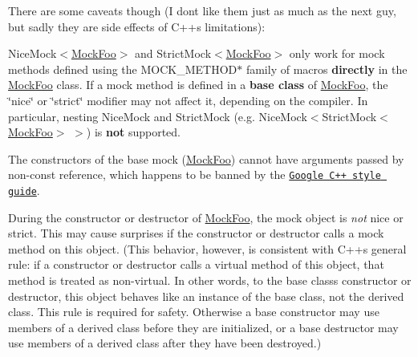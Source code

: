 There are some caveats though (I don\textquotesingle{}t like them just as much as the next guy, but sadly they are side effects of C++\textquotesingle{}s limitations)\+:


\begin{DoxyEnumerate}
\item {\ttfamily Nice\+Mock$<$\hyperlink{classMockFoo}{Mock\+Foo}$>$} and {\ttfamily Strict\+Mock$<$\hyperlink{classMockFoo}{Mock\+Foo}$>$} only work for mock methods defined using the {\ttfamily M\+O\+C\+K\+\_\+\+M\+E\+T\+H\+O\+D$\ast$} family of macros {\bfseries directly} in the {\ttfamily \hyperlink{classMockFoo}{Mock\+Foo}} class. If a mock method is defined in a {\bfseries base class} of {\ttfamily \hyperlink{classMockFoo}{Mock\+Foo}}, the \char`\"{}nice\char`\"{} or \char`\"{}strict\char`\"{} modifier may not affect it, depending on the compiler. In particular, nesting {\ttfamily Nice\+Mock} and {\ttfamily Strict\+Mock} (e.\+g. {\ttfamily Nice\+Mock$<$Strict\+Mock$<$\hyperlink{classMockFoo}{Mock\+Foo}$>$ $>$}) is {\bfseries not} supported.
\end{DoxyEnumerate}
\begin{DoxyEnumerate}
\item The constructors of the base mock ({\ttfamily \hyperlink{classMockFoo}{Mock\+Foo}}) cannot have arguments passed by non-\/const reference, which happens to be banned by the \href{https://google.github.io/styleguide/cppguide.html}{\tt Google C++ style guide}.
\end{DoxyEnumerate}
\begin{DoxyEnumerate}
\item During the constructor or destructor of {\ttfamily \hyperlink{classMockFoo}{Mock\+Foo}}, the mock object is {\itshape not} nice or strict. This may cause surprises if the constructor or destructor calls a mock method on {\ttfamily this} object. (This behavior, however, is consistent with C++\textquotesingle{}s general rule\+: if a constructor or destructor calls a virtual method of {\ttfamily this} object, that method is treated as non-\/virtual. In other words, to the base class\textquotesingle{}s constructor or destructor, {\ttfamily this} object behaves like an instance of the base class, not the derived class. This rule is required for safety. Otherwise a base constructor may use members of a derived class before they are initialized, or a base destructor may use members of a derived class after they have been destroyed.)
\end{DoxyEnumerate}

